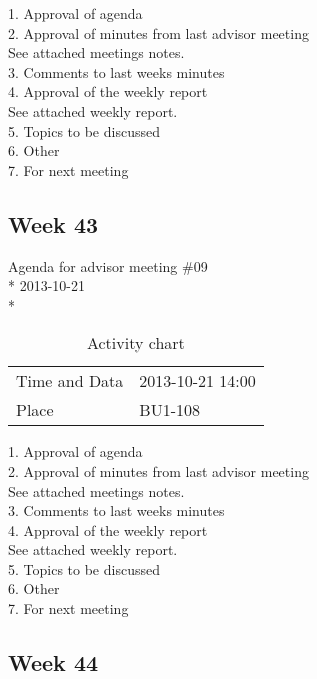 1. Approval of agenda \\
2. Approval of minutes from last advisor meeting \\
See attached meetings notes. \\
3. Comments to last weeks minutes \\
4. Approval of the weekly report \\
See attached weekly report. \\
5. Topics to be discussed \\
6. Other \\
7. For next meeting \\

\newpage
\subsection{Week 43}

\begin{center}
Agenda for advisor meeting \#09\\*
2013-10-21\\*
\end{center}

\begin{table}[H]
\begin{center}
\begin{tabular}{ l | l }
Time and Data & 2013-10-21 14:00 \\
Place & BU1-108 \\
\end{tabular}
\end{center}
\caption{Activity chart}
\label{table:activityChartAdvisorAgendaWeekN43}
\end{table}


1. Approval of agenda \\
2. Approval of minutes from last advisor meeting \\
See attached meetings notes. \\
3. Comments to last weeks minutes \\
4. Approval of the weekly report \\
See attached weekly report. \\
5. Topics to be discussed \\
6. Other \\
7. For next meeting \\

\newpage
\subsection{Week 44}


